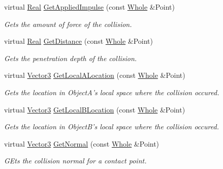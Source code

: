 \begin{DoxyCompactItemize}
virtual \hyperlink{namespaceMezzanine_a726731b1a7df72bf3583e4a97282c6f6}{Real} \hyperlink{classMezzanine_1_1Collision_aa53aa5016ea75885b9be4f317968b407}{GetAppliedImpulse} (const \hyperlink{namespaceMezzanine_adcbb6ce6d1eb4379d109e51171e2e493}{Whole} \&Point)
\begin{DoxyCompactList}\small\item\em Gets the amount of force of the collision. \item\end{DoxyCompactList}\item 
virtual \hyperlink{namespaceMezzanine_a726731b1a7df72bf3583e4a97282c6f6}{Real} \hyperlink{classMezzanine_1_1Collision_a365b382bac319b1258369c9bdeeb5048}{GetDistance} (const \hyperlink{namespaceMezzanine_adcbb6ce6d1eb4379d109e51171e2e493}{Whole} \&Point)
\begin{DoxyCompactList}\small\item\em Gets the penetration depth of the collision. \item\end{DoxyCompactList}\item 
virtual \hyperlink{classMezzanine_1_1Vector3}{Vector3} \hyperlink{classMezzanine_1_1Collision_a63a18605e0f34392f8521cdc3afd4b62}{GetLocalALocation} (const \hyperlink{namespaceMezzanine_adcbb6ce6d1eb4379d109e51171e2e493}{Whole} \&Point)
\begin{DoxyCompactList}\small\item\em Gets the location in ObjectA's local space where the collision occured. \item\end{DoxyCompactList}\item 
virtual \hyperlink{classMezzanine_1_1Vector3}{Vector3} \hyperlink{classMezzanine_1_1Collision_a6a75e50b8e2160e356e96080206d60bb}{GetLocalBLocation} (const \hyperlink{namespaceMezzanine_adcbb6ce6d1eb4379d109e51171e2e493}{Whole} \&Point)
\begin{DoxyCompactList}\small\item\em Gets the location in ObjectB's local space where the collision occured. \item\end{DoxyCompactList}\item 
virtual \hyperlink{classMezzanine_1_1Vector3}{Vector3} \hyperlink{classMezzanine_1_1Collision_abd59dc03ed9226275e85681ec3ef1555}{GetNormal} (const \hyperlink{namespaceMezzanine_adcbb6ce6d1eb4379d109e51171e2e493}{Whole} \&Point)
\begin{DoxyCompactList}\small\item\em GEts the collision normal for a contact point. \item\end{DoxyCompactList}\item 

\end{DoxyCompactItemize}
